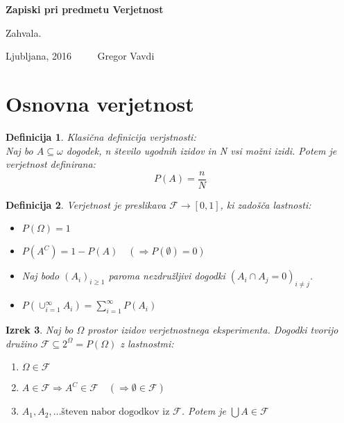 \documentclass[11pt]{article}
\newtheorem{Izrek}{{\sc Izrek}}[section]
\newtheorem{Definicija}[Izrek]{{\sc Definicija}}
\begin{document}
	\thispagestyle{empty}
	\begin{center}
		\begin{Large}
			{\bf Zapiski pri predmetu Verjetnost}
		\end{Large}
		
	\end{center}
	Zahvala.
	\vfill
	\begin{center}
		Ljubljana, 2016 $\quad \quad $ Gregor Vavdi
	\end{center}
	\newpage
	\setcounter{page}{1}

\section{Osnovna verjetnost}
\begin{Definicija}
	Klasična definicija verjstnosti:
	\\
	Naj bo  $A\subseteq \omega $ dogodek, n število ugodnih izidov in N vsi možni izidi. Potem je verjetnost definirana:
	$$P(A) = \frac{n}{N}$$
\end{Definicija}

\begin{Definicija}
Verjetnost je preslikava $\mathcal{F}\to [0,1]$, ki zadošča lastnosti:
\begin{itemize}
	\item
	$P(\Omega) = 1$
	\item
	$P(A^C) = 1 - P(A) \quad (\Rightarrow P(\emptyset) = 0)$
	\item
	Naj bodo $(A_i)_{i \ge 1} $ paroma nezdružljivi dogodki $(A_i \cap A_j = 0)_{i\neq j}$.
	\item
	$P(\cup_{i =1}^{\infty}A_i) = \sum_{i = 1}^{\infty}P(A_i)$
\end{itemize}
\end{Definicija}

\begin{Izrek}
	Naj bo $\Omega$ prostor izidov verjetnostnega eksperimenta. Dogodki tvorijo družino $\mathcal{F} \subseteq 2^\Omega = P(\Omega)$ z lastnostmi:
	\begin{enumerate}
		\item
		$\Omega \in \mathcal{F}$
		\item
		$ A \in \mathcal{F} \Rightarrow A^C \in \mathcal{F} \quad (\Rightarrow \emptyset \in \mathcal{F})$
		\item
		$A_1, A_2,\dots \text{števen nabor dogodkov iz } \mathcal{F}$. Potem je $\bigcup A \in \mathcal{F}$
	\end{enumerate}
\end{Izrek}
\end{document}
